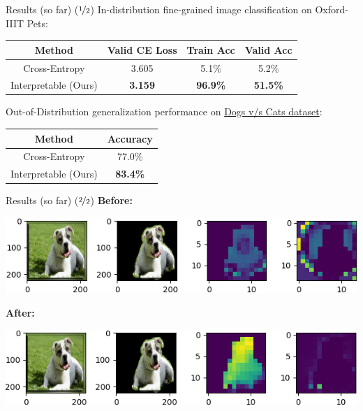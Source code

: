 \documentclass{beamer}
\begin{document}
\begin{frame}{Results (so far) ($\nicefrac{1}{2}$)}
	In-distribution fine-grained image classification on Oxford-IIIT Pets:
	\begin{table}[h]
		\centering
		\begin{tabular}{c|ccc}
			\toprule
			\textbf{Method}  & \textbf{Valid CE Loss}  & \textbf{Train Acc}   & \textbf{Valid Acc} \\
			\midrule
			Cross-Entropy & 3.605 & 5.1\% & 5.2\% \\
			Interpretable (Ours) & \bf 3.159 & \bf 96.9\% & \bf 51.5\% \\
			\bottomrule
		\end{tabular}
	\end{table} \pause
	Out-of-Distribution generalization performance on \href{https://www.kaggle.com/c/dogs-vs-cats}{Dogs v/s Cats dataset}:
	\begin{table}[h]
		\centering
		\begin{tabular}{c|c}
			\toprule
			\textbf{Method} & \textbf{Accuracy} \\
			\midrule
			Cross-Entropy & 77.0\% \\
			Interpretable (Ours) & \bf 83.4\% \\
			\bottomrule
		\end{tabular}
	\end{table}

\end{frame}

\begin{frame}{Results (so far) ($\nicefrac{2}{2}$)}
	\textbf{Before:}
	\begin{center}
		\includegraphics[width=\textwidth]{img/default.png}
	\end{center}

	\textbf{After:}
	\begin{center}
		\includegraphics[width=\textwidth]{img/contrastive.png}
	\end{center}
\end{frame}
\end{document}
